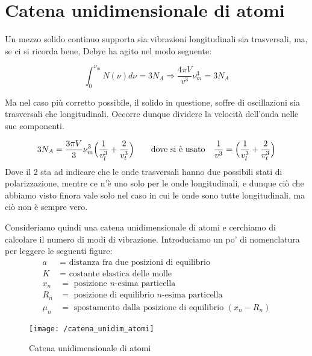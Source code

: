 
\section{Catena unidimensionale di atomi}

Un mezzo solido continuo supporta sia vibrazioni longitudinali sia trasversali, ma, se ci si ricorda bene, Debye ha agito nel modo seguente:

\begin{equation}
\int_0^{\nu_m} N(\nu) d\nu = 3 N_A \Rightarrow \frac{ 4\pi V}{v^3 } \nu_m^3 = 3 N_A
\end{equation}

Ma nel caso più corretto possibile, il solido in questione, soffre di oscillazioni sia trasversali che longitudinali.
Occorre dunque dividere la velocità dell'onda nelle sue componenti.

\begin{equation}
3N_A = \frac{ 3 \pi V}{3 } \nu_m^3 \Bigl(  \frac{ 1}{v_l^3 } + \frac{ 2}{v_t^3 }  \Bigr) \quad\quad \mbox{dove si è usato} \quad
\frac{ 1}{v^3 } = \Bigl(  \frac{ 1}{v_l^3 } + \frac{ 2}{v_t^3 }  \Bigr)
\end{equation}
Dove il 2 sta ad indicare che le onde trasversali hanno due possibili stati di polarizzazione, mentre ce n'è uno solo per le onde longitudinali,
e dunque ciò che abbiamo visto finora vale solo nel caso in cui le onde sono tutte longitudinali, ma ciò non è sempre vero.

Consideriamo quindi una catena unidimensionale di atomi e cerchiamo di calcolare il numero di modi di vibrazione.
Introduciamo un po' di nomenclatura per leggere le seguenti figure:
\begin{equation}
\begin{split}
a & = \mbox{ distanza fra due posizioni di equilibrio} \\
K & = \mbox{ costante elastica delle molle} \\
x_n & = \mbox{ posizione $n$-esima particella} \\
R_n & = \mbox{ posizione di equilibrio $n$-esima particella} \\
\mu_n & = \mbox{ spostamento dalla posizione di equilibrio } (x_n - R_n)
\end{split}
\end{equation}

\begin{figure}[h]
\centering
\texttt{[image: /catena\_unidim\_atomi]}
\caption{Catena unidimensionale di atomi}
\end{figure}

